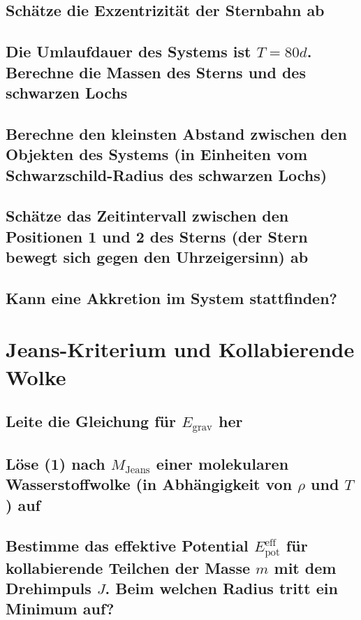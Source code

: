 \documentclass[12pt]{article}
\begin{document}
	\subsection{Schätze die Exzentrizität der Sternbahn ab}
	
	\subsection{Die Umlaufdauer des Systems ist $T = 80 d$. Berechne die Massen des Sterns und des schwarzen Lochs}
	
	\subsection{Berechne den kleinsten Abstand zwischen den Objekten des Systems (in Einheiten vom Schwarzschild-Radius des schwarzen Lochs)}
	
	\subsection{Schätze das Zeitintervall zwischen den Positionen 1 und 2 des Sterns (der Stern bewegt sich gegen den Uhrzeigersinn) ab}
	
	\subsection{Kann eine Akkretion im System stattfinden?}
	
	\section{Jeans-Kriterium und Kollabierende Wolke}
	\subsection{Leite die Gleichung für $E_{\mathrm{grav}}$ her}
	
	\subsection{Löse (1) nach $M_{\mathrm{Jeans}}$ einer molekularen Wasserstoffwolke (in Abhängigkeit von $\rho$ und $T$) auf}
	
	\subsection{Bestimme das effektive Potential $E_{\mathrm{pot}}^{\mathrm{eff}}$ für kollabierende Teilchen der Masse $m$ mit dem Drehimpuls $J$. Beim welchen Radius tritt ein Minimum auf?}
	
\end{document}
